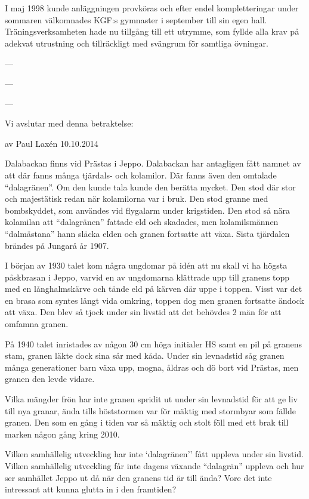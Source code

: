 I maj 1998 kunde anläggningen provköras och efter endel kompletteringar under sommaren välkomnades KGF:s gymnaster i september till sin egen hall. Träningsverksamheten hade nu tillgång till ett utrymme, som fyllde alla krav på adekvat utrustning och tillräckligt med svängrum för samtliga övningar.


---

---

---


Vi avslutar med denna betraktelse:

%

av Paul Laxén 10.10.2014

Dalabackan finns vid Prästas i Jeppo. Dalabackan har antagligen fått namnet av att där fanns många tjärdals- och kolamilor. Där fanns även den omtalade ``dalagränen''. Om den kunde tala kunde den berätta mycket. Den stod där stor och majestätisk redan när kolamilorna var i bruk. Den stod granne med bombskyddet, som användes vid flygalarm under krigstiden. Den stod så nära kolamilan att ``dalagränen'' fattade eld och skadades, men kolamilsmännen ``dalmästana'' hann släcka elden och granen fortsatte att växa. Sista tjärdalen brändes på Jungarå år 1907.

I början av 1930 talet kom några ungdomar på idén att nu skall vi ha högsta påskbrasan i Jeppo, varvid en av ungdomarna klättrade upp till granens topp med en långhalmskärve och tände eld på kärven där uppe i toppen. Visst var det en brasa som syntes långt vida omkring, toppen dog men granen fortsatte ändock att växa. Den blev så tjock under sin livstid att det behövdes 2 män för att omfamna granen.

På 1940 talet inristades av någon 30 cm höga initialer HS samt en pil på granens stam, granen läkte dock sina sår med kåda. Under sin levnadstid såg granen många generationer barn växa upp, mogna, åldras och dö bort vid Prästas, men granen den levde vidare.

Vilka mängder frön har inte granen spridit ut under sin levnadstid för att ge liv till nya granar, ända tills höststormen var för mäktig med stormbyar som fällde granen. Den som en gång i tiden var så mäktig och stolt föll med ett brak till marken någon gång kring 2010.

Vilken samhällelig utveckling har inte `dalagränen'' fått uppleva under sin livstid. Vilken samhällelig utveckling får inte dagens växande ``dalagrän'' uppleva och hur ser samhället Jeppo ut då när den granens tid är till ända? Vore det inte intressant att kunna glutta in i den framtiden?
